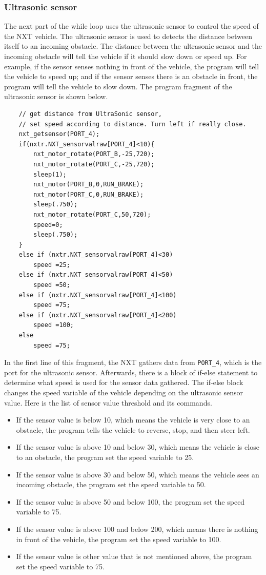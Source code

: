 \documentclass[12pt]{article}
\begin{document}
\subsubsection*{Ultrasonic sensor}
The next part of the while loop uses the ultrasonic sensor to control the speed of the NXT vehicle.
The ultrasonic sensor is used to detects the distance between itself to an incoming obstacle.
The distance between the ultrasonic sensor and the incoming obstacle will tell the vehicle if it should slow down or
    speed up.
For example, if the sensor senses nothing in front of the vehicle, the program will tell the vehicle to speed up; and
if the sensor senses there is an obstacle in front, the program will tell the vehicle to slow down.
The program fragment of the ultrasonic sensor is shown below.
\begin{verbatim}
    // get distance from UltraSonic sensor, 
    // set speed according to distance. Turn left if really close.
    nxt_getsensor(PORT_4);
    if(nxtr.NXT_sensorvalraw[PORT_4]<10){
        nxt_motor_rotate(PORT_B,-25,720);
        nxt_motor_rotate(PORT_C,-25,720);
        sleep(1);
        nxt_motor(PORT_B,0,RUN_BRAKE);
        nxt_motor(PORT_C,0,RUN_BRAKE);
        sleep(.750);
        nxt_motor_rotate(PORT_C,50,720);
        speed=0;
        sleep(.750);
    }
    else if (nxtr.NXT_sensorvalraw[PORT_4]<30)	
        speed =25;
    else if (nxtr.NXT_sensorvalraw[PORT_4]<50)
        speed =50;
    else if (nxtr.NXT_sensorvalraw[PORT_4]<100)	
        speed =75;
    else if (nxtr.NXT_sensorvalraw[PORT_4]<200)
        speed =100;
    else
        speed =75;
\end{verbatim}
In the first line of this fragment, the NXT gathers data from \verb+PORT_4+, which is the port for the ultrasonic sensor.
Afterwards, there is a block of if-else statement to determine what speed is used for the sensor data gathered.
The if-else block changes the speed variable of the vehicle depending on the ultrasonic sensor value.
Here is the list of sensor value threshold and its commands.
\begin{itemize}
\item If the sensor value is below 10, which means the vehicle is very close to an obstacle, the program tells the
    vehicle to reverse, stop, and then steer left.
\item If the sensor value is above 10 and below 30, which means the vehicle is close to an obstacle, the
    program set the speed variable to 25.
\item If the sensor value is above 30 and below 50, which means the vehicle sees an incoming obstacle, the
    program set the speed variable to 50.
\item If the sensor value is above 50 and below 100, the program set the speed variable to 75.
\item If the sensor value is above 100 and below 200, which means there is nothing in front of the vehicle,
    the program set the speed variable to 100.
\item If the sensor value is other value that is not mentioned above, the program set the speed variable to 75.
\end{itemize}
\end{document}
